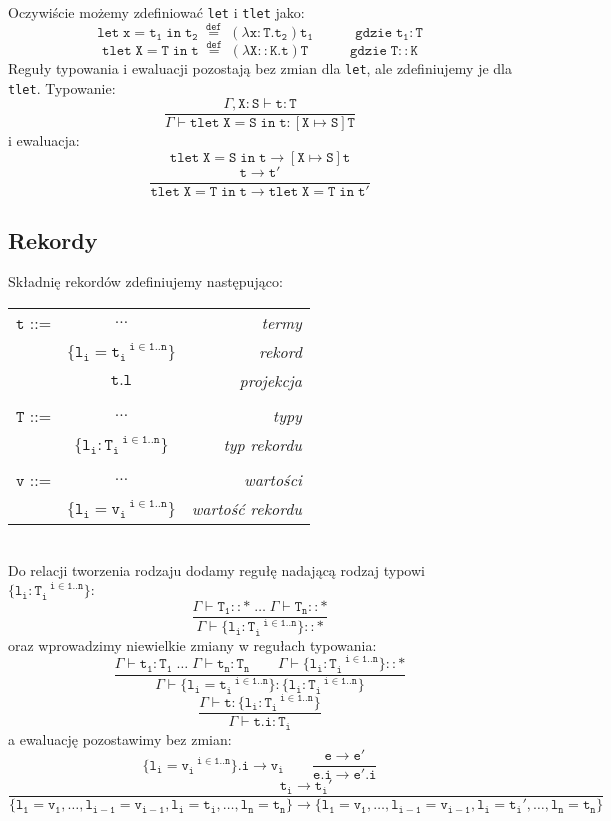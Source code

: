 \documentclass[11pt,leqno]{article}
\begin{document}
Oczywiście możemy zdefiniować \texttt{let} i \texttt{tlet} jako:
 	\[\mathtt{let\;x=t_1\;in\;t_2 \;\overset{def}{=}\;(\lambda x:T.t_2)t_1 \hspace{3em}\text{gdzie}\; t_1:T 
		}
	\]
 	\[\mathtt{tlet\;X=T\;in\;t \;\overset{def}{=}\;(\lambda X::K.t)T \hspace{3em}\text{gdzie}\; T::K 
		}
	\]
Reguły typowania i ewaluacji pozostają bez zmian dla \texttt{let}, ale zdefiniujemy je dla \texttt{tlet}.
Typowanie:
 	\[\mathtt{ \frac{\Gamma,X:S \vdash t:T}{\Gamma \vdash tlet\;X=S\;in\;t : [X \mapsto S]T}
		}
	\]
i ewaluacja:
 	\[\mathtt{ tlet\;X=S\;in\;t \longrightarrow [X \mapsto S]t
		}
	\]
 	\[\mathtt{ \frac{t \longrightarrow t'}{tlet\;X=T\;in\;t \longrightarrow tlet\;X=T\;in\;t'}
		}
	\]
\subsection{Rekordy}

Składnię rekordów zdefiniujemy następująco:\\

\begin{tabular}{| l c r |}
  \hline
  $\mathtt{t}$ ::= & $\dots$ & \textit{termy}  \\
   & $\mathtt{\{l_i=t_i^{\;\;\;i \in 1..n}\}}$ & \textit{rekord} \\
   & $\mathtt{t.l}$ & \textit{projekcja} \\ 
   & & \\
  $\mathtt{T}$ ::= & $\dots$ & \textit{typy}  \\
   & $\mathtt{\{l_i:T_i^{\;\;\;i \in 1..n}\}}$ & \textit{typ rekordu} \\
   & & \\
  $\mathtt{v}$ ::= & $\dots$ & \textit{wartości}  \\
   & $\mathtt{\{l_i=v_i^{\;\;\;i \in 1..n}\}}$ & \textit{wartość rekordu} \\
  \hline
\end{tabular} \\

Do relacji tworzenia rodzaju dodamy regułę nadającą rodzaj typowi $\mathtt{\{l_i:T_i^{\;\;\;i \in 1..n}\}}$:~\[\mathtt{
             \frac{\Gamma \vdash T_1::\ast \;\dots\;\Gamma \vdash T_n::\ast}{\Gamma \vdash \{l_i:T_i^{\;\;\;i \in 1..n}\}::\ast}
		}
	\]
oraz wprowadzimy niewielkie zmiany w regułach typowania:~\[\mathtt{
             \frac{\Gamma \vdash t_1:T_1 \;\dots\;\Gamma \vdash t_n:T_n \hspace{2em} \Gamma \vdash \{l_i:T_i^{\;\;\;i \in 1..n}\}::\ast}{\Gamma \vdash \{l_i=t_i^{\;\;\;i \in 1..n}\}:\{l_i:T_i^{\;\;\;i \in 1..n}\}}
            }
	\]
 	\[\mathtt{
           \frac{\Gamma \vdash t : \{l_i:T_i^{\;\;\;i \in 1..n}\}}{\Gamma \vdash t.i : T_i} 
            }
	\]
a ewaluację pozostawimy bez zmian: \\
 	\[\mathtt{
                \{l_i=v_i^{\;\;\;i \in 1..n}\}.i \longrightarrow v_i
                \qquad
                \frac{e \longrightarrow e'}{e.i \longrightarrow e'.i}
		}
	\]
\small{
 	\[\mathtt{
                \frac{t_i \longrightarrow t_i'}{\{l_1=v_1, \dots, l_{i-1}=v_{i-1}, l_i=t_i, \dots, l_n=t_n\} \longrightarrow \{l_1=v_1, \dots, l_{i-1}=v_{i-1}, l_i=t_i', \dots, l_n=t_n\}}
		}
	\]
}
\end{document}
